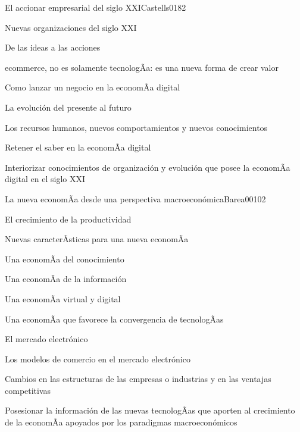 \begin{syllabus}
\begin{unit}{El accionar empresarial del siglo XXI}{Castells01}{8}{2}
   \begin{topics}
      \item Nuevas organizaciones del siglo XXI
	\item De las ideas a las acciones
	\item ecommerce, no es solamente tecnologÃ­a: es una nueva forma de crear valor
	\item Como lanzar un negocio en la economÃ­a digital
	\item La evolución del presente al futuro
	\item Los recursos humanos, nuevos comportamientos y nuevos conocimientos
	\item Retener el saber en la economÃ­a digital
   \end{topics}

   \begin{unitgoals}
      \item Interiorizar conocimientos de organización y evolución que posee la economÃ­a digital en el siglo XXI
   \end{unitgoals}
\end{unit}

\begin{unit}{La nueva economÃ­a desde una perspectiva macroeconómica}{Barea00}{10}{2}
   \begin{topics}
      \item El crecimiento de la productividad
	\item Nuevas caracterÃ­sticas para una nueva economÃ­a
	\item Una economÃ­a del conocimiento
	\item Una economÃ­a de la información
	\item Una economÃ­a virtual y digital
	\item Una economÃ­a que favorece la convergencia de tecnologÃ­as
	\item El mercado electrónico
	\item Los modelos de comercio en el mercado electrónico
	\item Cambios en las estructuras de las empresas o industrias y en las ventajas competitivas
  \end{topics}

   \begin{unitgoals}
      \item Posesionar la información de las nuevas tecnologÃ­as que aporten al crecimiento de la economÃ­a apoyados por los paradigmas macroeconómicos
   \end{unitgoals}
\end{unit}


\end{syllabus}
